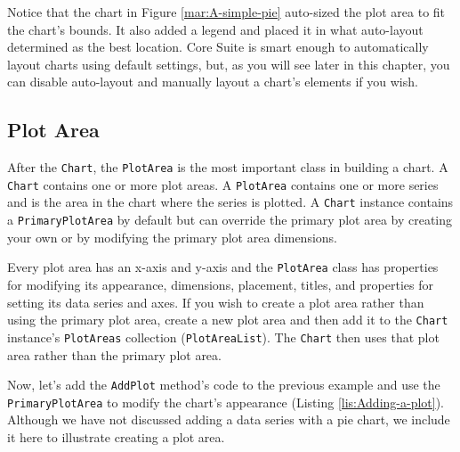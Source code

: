 \documentclass[american,letterpaper]{tufte-book}
\numberwithin{equation}{section}
\numberwithin{figure}{section}
\begin{document}
{Notice that the chart in Figure \ref{mar:A-simple-pie} auto-sized
the plot area to fit the chart's bounds. It also added a legend and
placed it in what auto-layout determined as the best location. Core
Suite is smart enough to automatically layout charts using default
settings, but, as you will see later in this chapter, you can disable
auto-layout and manually layout a chart's elements if you wish.

\subsection{Plot Area}

After the \texttt{Chart}, the \texttt{PlotArea} is the most important
class in building a chart. A \texttt{Chart} contains one or more plot
areas. A \texttt{PlotArea} contains one or more series and is the
area in the chart where the series is plotted. A \texttt{Chart} instance
contains a \texttt{PrimaryPlotArea} by default but can override the
primary plot area by creating your own or by modifying the primary
plot area dimensions.

Every plot area has an x-axis and y-axis and the \texttt{PlotArea}
class has properties for modifying its appearance, dimensions, placement,
titles, and properties for setting its data series and axes. If you
wish to create a plot area rather than using the primary plot area,
create a new plot area and then add it to the \texttt{Chart} instance's
\texttt{PlotAreas} collection (\texttt{PlotAreaList}). The \texttt{Chart}
then uses that plot area rather than the primary plot area.

Now, let's add the \texttt{AddPlot} method's code to the previous
example and use the \texttt{PrimaryPlotArea} to modify the chart's
appearance (Listing \ref{lis:Adding-a-plot}). Although we have not
discussed adding a data series with a pie chart, we include it here
to illustrate creating a plot area. 

}
\end{document}
